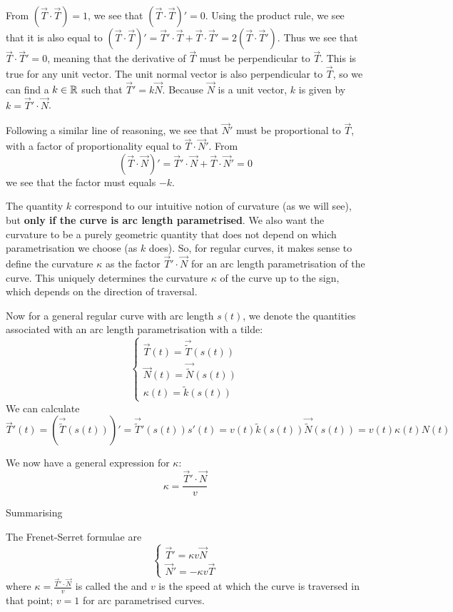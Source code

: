 From $(\vec{T}\cdot \vec{T}) = 1$, we see that $(\vec{T}\cdot \vec{T})' = 0$. Using the product rule, we see that it is also equal to $(\vec{T}\cdot \vec{T})' = \vec{T}'\cdot\vec{T} + \vec{T}\cdot\vec{T}' = 2(\vec{T}\cdot \vec{T}')$. Thus we see that $\vec{T}\cdot \vec{T}' = 0$, meaning that the derivative of $\vec{T}$ must be perpendicular to $\vec{T}$. This is true for any unit vector. The unit normal vector is also perpendicular to $\vec{T}$, so we can find a $k \in \mathbb{R}$ such that $\vec{T}' = k \vec{N}$. Because $\vec{N}$ is a unit vector, $k$ is given by $k = \vec{T}'\cdot \vec{N}$.

Following a similar line of reasoning, we see that $\vec{N}'$ must be proportional to $\vec{T}$, with a factor of proportionality equal to $\vec{T}\cdot \vec{N}'$. From
\[ (\vec{T}\cdot \vec{N})' = \vec{T}'\cdot \vec{N} + \vec{T}\cdot \vec{N}' = 0 \]
we see that the factor must equals $-k$.

The quantity $k$ correspond to our intuitive notion of curvature (as we will see), but \textbf{only if the curve is arc length parametrised}. We also want the curvature to be a purely geometric quantity that does not depend on which parametrisation we choose (as $k$ does). So, for regular curves, it makes sense to define the curvature $\kappa$ as the factor $\vec{T}'\cdot \vec{N}$ for an arc length parametrisation of the curve. This uniquely determines the curvature $\kappa$ of the curve up to the sign, which depends on the direction of traversal.

Now for a general regular curve with arc length $s(t)$, we denote the quantities associated with an arc length parametrisation with a tilde:
\[ \begin{cases}
\vec{T}(t) = \vec{\tilde{T}}(s(t)) \\
\vec{N}(t) = \vec{\tilde{N}}(s(t)) \\
\kappa(t) = \tilde{k}(s(t))
\end{cases} \]
We can calculate
\[ \vec{T}'(t) = (\vec{\tilde{T}}(s(t)))' = \vec{\tilde{T}}'(s(t))s'(t) = v(t)\tilde{k}(s(t))\vec{\tilde{N}}(s(t)) = v(t)\kappa(t)N(t) \]

We now have a general expression for $\kappa$:
\[ \kappa = \frac{\vec{T}'\cdot \vec{N}}{v} \]

Summarising
\begin{eigenschap}
The Frenet-Serret formulae are
\[ \begin{cases}
\vec{T}' = \kappa v \vec{N} \\
\vec{N}' = -\kappa v \vec{T}
\end{cases} \]
where $\kappa = \frac{\vec{T}'\cdot \vec{N}}{v}$ is called the  and $v$ is the speed at which the curve is traversed in that point; $v=1$ for arc parametrised curves.
\end{eigenschap}

